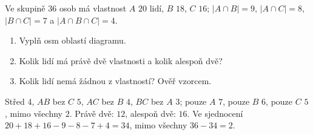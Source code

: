 \documentclass[11pt,a4paper]{article}
\begin{document}
\begin{zadaniReseniBox}[title={Domácí úkol}]
Ve skupině $36$ osob má vlastnost $A$ $20$ lidí, $B$ $18$, $C$ $16$;
$|A\cap B|=9$, $|A\cap C|=8$, $|B\cap C|=7$ a
$|A\cap B\cap C|=4$.
\begin{enumerate}[label=\alph*)]
\item Vyplň osm oblastí diagramu.
\item Kolik lidí má právě dvě vlastnosti a kolik alespoň dvě?
\item Kolik lidí nemá žádnou z vlastností? Ověř vzorcem.
\end{enumerate}
\tcblower
Střed $4$, $AB$ bez $C$ $5$, $AC$ bez $B$ $4$, $BC$ bez $A$ $3$;
pouze $A$ $7$, pouze $B$ $6$, pouze $C$ $5$, mimo všechny $2$.
Právě dvě: $12$, alespoň dvě: $16$.
Ve sjednocení $20+18+16-9-8-7+4=34$, mimo všechny $36-34=2$.
\end{zadaniReseniBox}
\end{document}
